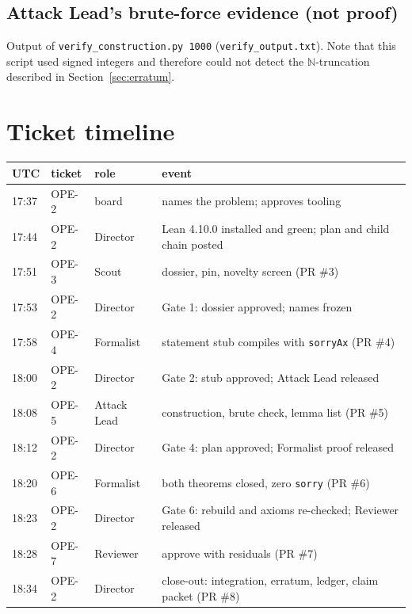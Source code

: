 \documentclass[11pt,a4paper]{article}
\theoremstyle{definition}
\theoremstyle{remark}
\newcommand{\lean}[1]{\texttt{#1}}
\newcommand{\N}{\mathbb{N}}
\begin{document}
\subsection{Attack Lead's brute-force evidence (not proof)}
Output of \texttt{verify\_construction.py 1000} (\texttt{verify\_output.txt}). Note that this
script used signed integers and therefore could not detect the $\N$-truncation described in
Section~\ref{sec:erratum}.

\section{Ticket timeline}
\label{app:timeline}

\begin{center}\small
\begin{tabular}{@{}llll@{}}
\toprule
UTC & ticket & role & event \\
\midrule
17:37 & OPE-2 & board & names the problem; approves tooling \\
17:44 & OPE-2 & Director & Lean 4.10.0 installed and green; plan and child chain posted \\
17:51 & OPE-3 & Scout & dossier, pin, novelty screen (PR \#3) \\
17:53 & OPE-2 & Director & Gate 1: dossier approved; names frozen \\
17:58 & OPE-4 & Formalist & statement stub compiles with \lean{sorryAx} (PR \#4) \\
18:00 & OPE-2 & Director & Gate 2: stub approved; Attack Lead released \\
18:08 & OPE-5 & Attack Lead & construction, brute check, lemma list (PR \#5) \\
18:12 & OPE-2 & Director & Gate 4: plan approved; Formalist proof released \\
18:20 & OPE-6 & Formalist & both theorems closed, zero \lean{sorry} (PR \#6) \\
18:23 & OPE-2 & Director & Gate 6: rebuild and axioms re-checked; Reviewer released \\
18:28 & OPE-7 & Reviewer & approve with residuals (PR \#7) \\
18:34 & OPE-2 & Director & close-out: integration, erratum, ledger, claim packet (PR \#8) \\
\bottomrule
\end{tabular}
\end{center}
\end{document}
